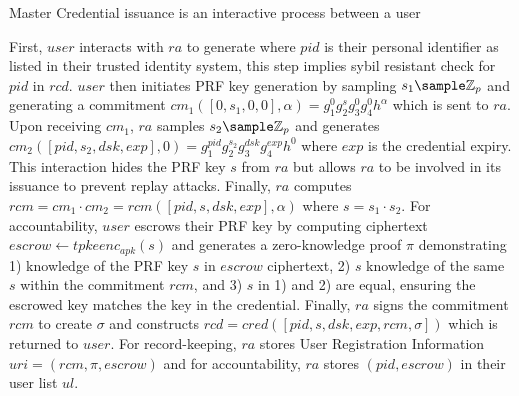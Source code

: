 Master Credential issuance is an interactive process between a user 


First, $user$ interacts with $ra$ to generate where $pid$ is their personal identifier as listed in their trusted identity system, this step implies sybil resistant check for $pid$ in $rcd$. $user$ then initiates PRF key generation by sampling $s_1 \sample \Z_p$ and generating a commitment $cm_1([0, s_1, 0, 0], \alpha) = g_1^0g_2^sg_3^0g_4^0h^{\alpha}$ which is sent to $ra$. Upon receiving $cm_1$, $ra$ samples $s_2 \sample \Z_p$ and generates $cm_2([pid, s_2, dsk, exp ], 0) = g_1^{pid}g_2^{s_2}g_3^{dsk}g_4^{exp}h^0$ where $exp$ is the credential expiry. This interaction hides the PRF key $s$ from $ra$ but allows $ra$ to be involved in its issuance to prevent replay attacks. Finally, $ra$ computes $rcm = cm_1 \cdot cm_2 = rcm([pid, s, dsk, exp ], \alpha)$ where $s = s_1 \cdot s_2$. For accountability, $user$ escrows their PRF key by computing ciphertext $escrow \gets tpkeenc_{apk}(s)$ and generates a zero-knowledge proof $\pi$ demonstrating 1) knowledge of the PRF key $s$ in $escrow$ ciphertext, 2) $s$ knowledge of the same $s$ within the commitment $rcm$, and  3) $s$ in 1) and 2) are equal, ensuring the escrowed key matches the key in the credential. Finally, $ra$ signs the commitment $rcm$ to create $\sigma$ and constructs $rcd = cred([pid, s, dsk, exp, rcm, \sigma])$ which is returned to $user$. For record-keeping, $ra$ stores User Registration Information $uri =(rcm, \pi, escrow)$ and for accountability, $ra$ stores $(pid, escrow)$ in their user list $ul$.









